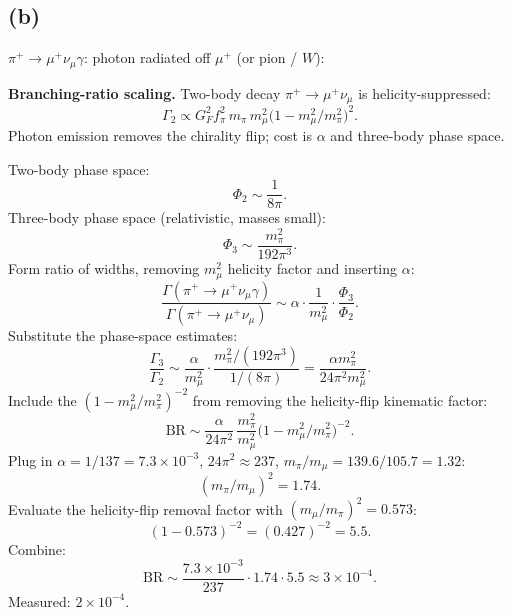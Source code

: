 \documentclass[11pt]{article}
\begin{document}
\subsection*{(b)}

$\pi^+ \to \mu^+\nu_\mu\gamma$: photon radiated off $\mu^+$ (or pion / $W$):

\begin{center}
\end{center}

\textbf{Branching-ratio scaling.} Two-body decay $\pi^+\to\mu^+\nu_\mu$ is helicity-suppressed:
\[ \Gamma_{2} \propto G_F^2 f_\pi^2\, m_\pi\, m_\mu^2 \bigl(1 - m_\mu^2/m_\pi^2\bigr)^2. \]
Photon emission removes the chirality flip; cost is $\alpha$ and three-body phase space.

Two-body phase space:
\[ \Phi_2 \sim \frac{1}{8\pi}. \]
Three-body phase space (relativistic, masses small):
\[ \Phi_3 \sim \frac{m_\pi^2}{192\pi^3}. \]
Form ratio of widths, removing $m_\mu^2$ helicity factor and inserting $\alpha$:
\[ \frac{\Gamma(\pi^+\to\mu^+\nu_\mu\gamma)}{\Gamma(\pi^+\to\mu^+\nu_\mu)} \sim \alpha \cdot \frac{1}{m_\mu^2}\cdot \frac{\Phi_3}{\Phi_2}. \]
Substitute the phase-space estimates:
\[ \frac{\Gamma_3}{\Gamma_2} \sim \frac{\alpha}{m_\mu^2}\cdot \frac{m_\pi^2/(192\pi^3)}{1/(8\pi)} = \frac{\alpha m_\pi^2}{24\pi^2 m_\mu^2}. \]
Include the $(1-m_\mu^2/m_\pi^2)^{-2}$ from removing the helicity-flip kinematic factor:
\[ \boxed{\;\text{BR} \sim \frac{\alpha}{24\pi^2}\,\frac{m_\pi^2}{m_\mu^2}\bigl(1-m_\mu^2/m_\pi^2\bigr)^{-2}.\;} \]
Plug in $\alpha = 1/137 = 7.3\times 10^{-3}$, $24\pi^2 \approx 237$, $m_\pi/m_\mu = 139.6/105.7 = 1.32$:
\[ (m_\pi/m_\mu)^2 = 1.74. \]
Evaluate the helicity-flip removal factor with $(m_\mu/m_\pi)^2 = 0.573$:
\[ (1-0.573)^{-2} = (0.427)^{-2} = 5.5. \]
Combine:
\[ \text{BR} \sim \frac{7.3\times 10^{-3}}{237}\cdot 1.74 \cdot 5.5 \approx 3\times 10^{-4}. \]
Measured: $2\times 10^{-4}$.
\end{document}
